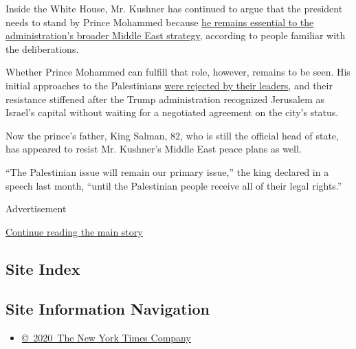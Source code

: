 Inside the White House, Mr. Kushner has continued to argue that the
president needs to stand by Prince Mohammed because
\href{https://www.nytimes.com/2018/11/01/world/middleeast/with-saudi-prince-holding-on-to-power-us-seen-standing-by-him.html}{he
remains essential to the administration's broader Middle East strategy},
according to people familiar with the deliberations.

Whether Prince Mohammed can fulfill that role, however, remains to be
seen. His initial approaches to the Palestinians
\href{https://www.nytimes.com/2017/12/03/world/middleeast/palestinian-saudi-peace-plan.html}{were
rejected by their leaders}, and their resistance stiffened after the
Trump administration recognized Jerusalem as Israel's capital without
waiting for a negotiated agreement on the city's status.

Now the prince's father, King Salman, 82, who is still the official head
of state, has appeared to resist Mr. Kushner's Middle East peace plans
as well.

``The Palestinian issue will remain our primary issue,'' the king
declared in a speech last month, ``until the Palestinian people receive
all of their legal rights.''

Advertisement

\protect\hyperlink{after-bottom}{Continue reading the main story}

\hypertarget{site-index}{%
\subsection{Site Index}\label{site-index}}

\hypertarget{site-information-navigation}{%
\subsection{Site Information
Navigation}\label{site-information-navigation}}

\begin{itemize}
\tightlist
\item
  \href{https://help.nytimes.com/hc/en-us/articles/115014792127-Copyright-notice}{©~2020~The
  New York Times Company}
\end{itemize}

